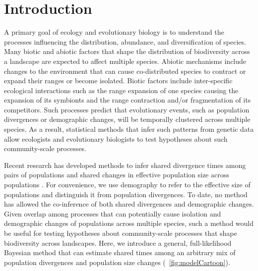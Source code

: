 \section{Introduction}

A primary goal of ecology and evolutionary biology is to understand the
processes influencing the distribution, abundance, and diversification of
species.
Many biotic and abiotic factors that shape the distribution of biodiversity
across a landscape are expected to affect multiple species.
Abiotic mechanisms include changes to the environment that can cause
co-distributed species to contract or expand their ranges or become isolated.
Biotic factors include inter-specific ecological interactions such as the range
expansion of one species causing the expansion of its symbionts and the range
contraction and/or fragmentation of its competitors.
Such processes predict that evolutionary events, such as population divergences
or demographic changes,
will be temporally clustered across multiple species.
As a result, statistical methods that infer such patterns from genetic data
allow ecologists and evolutionary biologists to test hypotheses about such
community-scale processes.

Recent research has developed methods to infer shared divergence times
among pairs of populations
\citep{Hickerson2006,Hickerson2007,Huang2011,Oaks2014dpp,Oaks2018ecoevolity}
and shared changes in effective population size across populations
\citep{Chan2014,Xue2015,Burbrink2016,Xue2017,Gehara2017}.
For convenience, we use demography to refer to the effective size of
populations and distinguish it from population divergences.
To date, no method has allowed the co-inference of both shared divergences
and demographic changes.
Given overlap among processes that can potentially cause isolation and
demographic changes of populations across multiple species, such a method would
be useful for testing hypotheses about community-scale processes that shape
biodiversity across landscapes.
Here, we introduce a general, full-likelihood Bayesian method that can estimate
shared times among an arbitrary mix of population divergences and population
size changes (\fig{}~\ref{fig:modelCartoon}).


